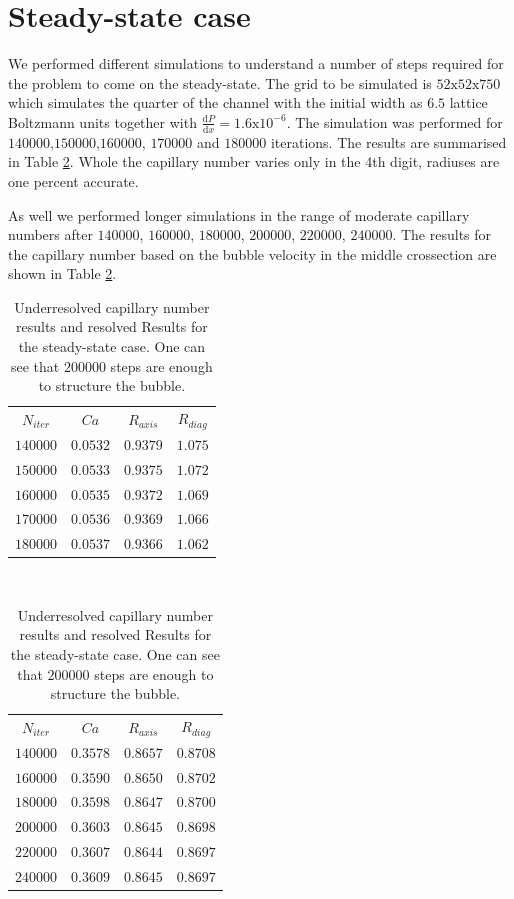 \documentclass{article}
\begin{document}
\section{Steady-state case}
We performed different simulations to understand a number of steps required for the problem to come
on the steady-state. The grid to be simulated is $52\mathrm{x}52\mathrm{x}750$ which simulates the
quarter of the channel with the initial
width as $6.5$ lattice Boltzmann units together with $\frac{\mathrm{d}P}{\mathrm{d}x}=1.6
\mathrm{x}10^{-6}$. The simulation was performed for $140000$,$150000$,$160000$, $170000$ and
$180000$ iterations. The results are summarised in Table \ref{table:steady:state}. Whole the
capillary number varies only in the 4th digit, radiuses are one percent accurate. 

As well we performed longer simulations in the range of moderate capillary numbers after
$140000$, $160000$, $180000$, $200000$, $220000$, $240000$. The results for the capillary number
based on the bubble velocity in the middle crossection are shown in Table \ref{table:steady:state}. 
\begin{table}
\begin{center}
\begin{tabular}{|c|c|c|c|}
\hline
$N_{iter}$&$Ca$&$R_{axis}$&$R_{diag}$\\
$140000$&$0.0532$&$0.9379$&$1.075$\\
$150000$&$0.0533$&$0.9375$&$1.072$\\
$160000$&$0.0535$&$0.9372$&$1.069$\\
$170000$&$0.0536$&$0.9369$&$1.066$\\
$180000$&$0.0537$&$0.9366$&$1.062$\\
\hline
\end{tabular}\\
\begin{tabular}{|c|c|c|c|}
\hline
$N_{iter}$&$Ca$&$R_{axis}$&$R_{diag}$\\
$140000$&$0.3578$&$0.8657$&$0.8708$\\
$160000$&$0.3590$&$0.8650$&$0.8702$\\
$180000$&$0.3598$&$0.8647$&$0.8700$\\
$200000$&$0.3603$&$0.8645$&$0.8698$\\
$220000$&$0.3607$&$0.8644$&$0.8697$\\
$240000$&$0.3609$&$0.8645$&$ 0.8697$\\
\hline
\end{tabular}
\end{center}
\caption{Underresolved capillary number results and resolved Results for the steady-state case. One
can see that $200000$ steps are enough to structure
the bubble. \label{table:steady:state}}
\end{table}
\end{document}

